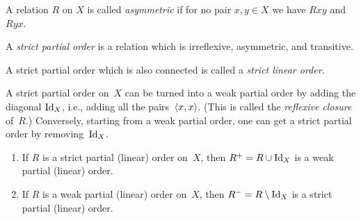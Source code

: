 \documentclass[../../../include/open-logic-section]{subfiles}
\begin{document}
\begin{defn}[Asymmetry]
A relation $R$ on $X$ is called \emph{asymmetric} if for no pair $x,y\in
X$ we have $Rxy$ and $Ryx$. 
\end{defn}

\begin{defn}
A \emph{strict partial order} is a relation which is irreflexive, 
asymmetric, and transitive. 
\end{defn}

\begin{defn}
A strict partial order which is also connected is called a \emph{strict linear
  order.}
\end{defn}

A strict partial order on~$X$ can be turned into a weak partial order
by adding the diagonal $\mathord{\mathrm{Id}_{X}}$, i.e., adding all the pairs~$\langle x,
  x \rangle$.  (This is called the \emph{reflexive closure} of~$R$.)
Conversely, starting from a weak partial order, one can get a strict
partial order by removing~$\mathord{\mathrm{Id}_{X}}$.

\begin{prop}
  \begin{enumerate}
  \item If $R$ is a strict partial (linear) order on~$X$, then $R^+ = R
    \cup \mathord{\mathrm{Id}_{X}}$ is a weak partial (linear) order.
  \item If $R$ is a weak partial (linear) order on~$X$, then $R^- = R
    \setminus \mathord{\mathrm{Id}_{X}}$ is a strict partial (linear) order.
  \end{enumerate}
\end{prop}
\end{document}
